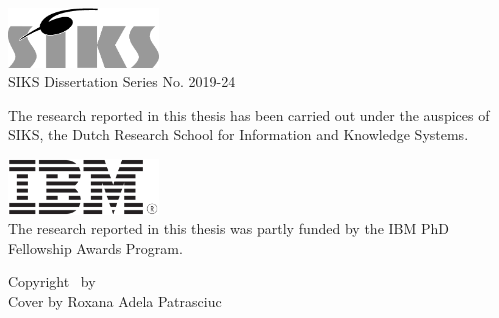 \thispagestyle{empty}

\begin{addmargin}[-3cm]{1cm}
\vfill

\includegraphics[width=4cm]{front_back_matter/imgs/siks_zw.eps}\\
SIKS Dissertation Series No. 2019-24\bigskip
  

\noindent The research reported in this thesis has been carried out under the auspices of SIKS, the Dutch Research School for Information and Knowledge Systems.\bigskip\bigskip

\noindent \includegraphics[width=4cm]{front_back_matter/imgs/ibm.png}\\
The research reported in this thesis was partly funded by the IBM PhD Fellowship Awards Program.\bigskip\bigskip


\vfill
\noindent Copyright \textcopyright\ \myTime by \myName \\
Cover by Roxana Adela Patrasciuc
\end{addmargin}